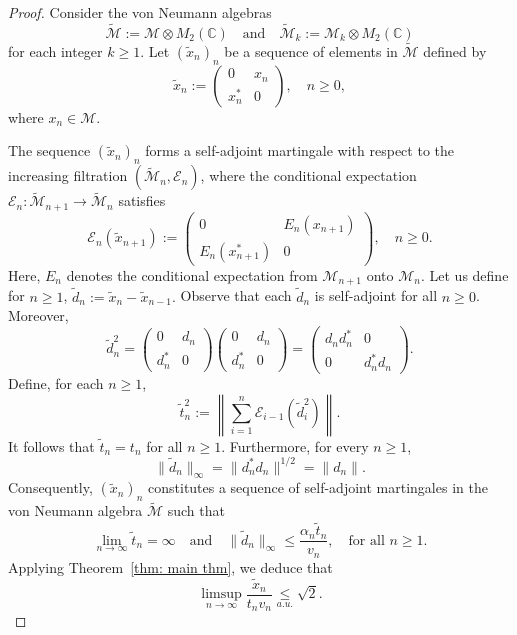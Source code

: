 \documentclass[10pt,a4paper]{amsart}
\newcommand{\CE}{\mathcal{E}}
\begin{document}
\begin{proof}
    Consider the von Neumann algebras 
    $$
    \tilde{\mathcal{M}} := \mathcal{M} \otimes M_2(\mathbb{C}) \quad \text{and} \quad \tilde{\mathcal{M}}_k := \mathcal{M}_k \otimes M_2(\mathbb{C})
    $$
    for each integer $k \geq 1$. Let $(\tilde{x}_n)_n$ be a sequence of elements in $\tilde{\mathcal{M}}$ defined by
    $$
    \tilde{x}_n := \begin{pmatrix}
    0 & x_n \\
    x_n^* & 0
    \end{pmatrix}, \quad n \geq 0,
    $$
    where $x_n \in \mathcal{M}$.
    
    The sequence $(\tilde{x}_n)_n$ forms a self-adjoint martingale with respect to the increasing filtration $(\tilde{\mathcal{M}}_n, \mathcal{E}_n)$, where the conditional expectation 
    $\mathcal{E}_n : \tilde{\mathcal{M}}_{n+1} \to \tilde{\mathcal{M}}_n$
    satisfies
    $$
    \mathcal{E}_n(\tilde{x}_{n+1}) := \begin{pmatrix}
    0 & E_n(x_{n+1}) \\
    E_n(x_{n+1}^*) & 0
    \end{pmatrix}, \quad n \geq 0.
    $$
    Here, $E_n$ denotes the conditional expectation from $\mathcal{M}_{n+1}$ onto $\mathcal{M}_n$.
    Let us define for $n\geq1$,
    $\tilde{d}_n := \tilde{x}_n - \tilde{x}_{n-1}.$
    Observe that each $\tilde{d}_n$ is self-adjoint for all $n \geq 0$. Moreover,
    \[
        \tilde{d}_n^2 = 
        \begin{pmatrix} 0 & d_n \\ d_n^* & 0 \end{pmatrix} 
        \begin{pmatrix} 0 & d_n \\ d_n^* & 0 \end{pmatrix} =
        \begin{pmatrix} d_n d_n^* & 0 \\ 0 & d_n^* d_n \end{pmatrix}.
    \]
    Define, for each $n \geq 1$,
    \[
        \tilde{t}_n^2 := \left\| \sum_{i=1}^n \CE_{i-1}\left(\tilde{d}_i^2\right) \right\|.
    \]
    It follows that $\tilde{t}_n = t_n$ for all $n \geq 1$. Furthermore, for every $n \geq 1$,
    \[
        \|\tilde{d}_n\|_\infty = \|d_n^* d_n\|^{1/2} = \|d_n\|.
    \]
    Consequently, $(\tilde{x}_n)_n$ constitutes a sequence of self-adjoint martingales in the von Neumann algebra $\tilde{\mathcal{M}}$ such that
    \[
        \lim_{n \to \infty} \tilde{t}_n = \infty
        \quad \text{and} \quad
        \|\tilde{d}_n\|_\infty \leq \frac{\alpha_n \tilde{t}_n}{v_n}, \quad \text{for all } n \geq 1.
    \]
    Applying Theorem~\ref{thm: main thm}, we deduce that
    \[
        \limsup_{n \to \infty} \frac{\tilde{x}_n}{t_n v_n} \underset{a.u.}{\leq} \sqrt{2}.
    \]


\end{proof}
\end{document}
